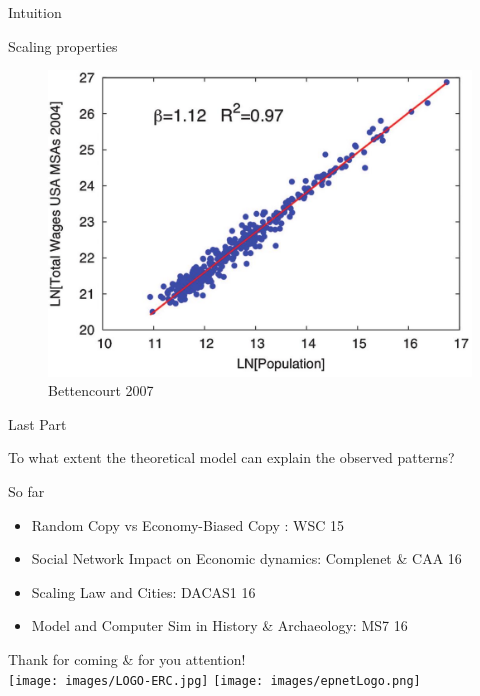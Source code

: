 \documentclass[12pt, notes=show,handout=no]{beamer}
\begin{document}
\begin{frame}{Intuition}
\end{frame}

\begin{frame}{Scaling properties}
    \begin{figure}
	\includegraphics[width=.8\textwidth]{images/wageVsSize.jpg}
	\caption{ Bettencourt 2007}
    \end{figure}
\end{frame}



\begin{frame}
    \centering
    \Large
  Last Part
\end{frame}

\begin{frame}
 To what extent the theoretical model can explain the observed patterns?
    

\end{frame}

\begin{frame}{So far}
    \small
    \begin{itemize}
	\item Random Copy vs Economy-Biased Copy : WSC 15
	\item Social Network Impact on Economic dynamics: Complenet \& CAA 16
	\item  Scaling Law and Cities: DACAS1 16
	\item  Model and Computer Sim in History \&  Archaeology: MS7 16
    \end{itemize}
    
\end{frame}

\begin{frame}
	\begin{center}
		\Large
    Thank for coming \& for you attention!\\
		\vspace{1cm}
		\texttt{[image: images/LOGO-ERC.jpg]} \hfil	\texttt{[image: images/epnetLogo.png]}\\
	\end{center}


\end{frame}
\end{document}
